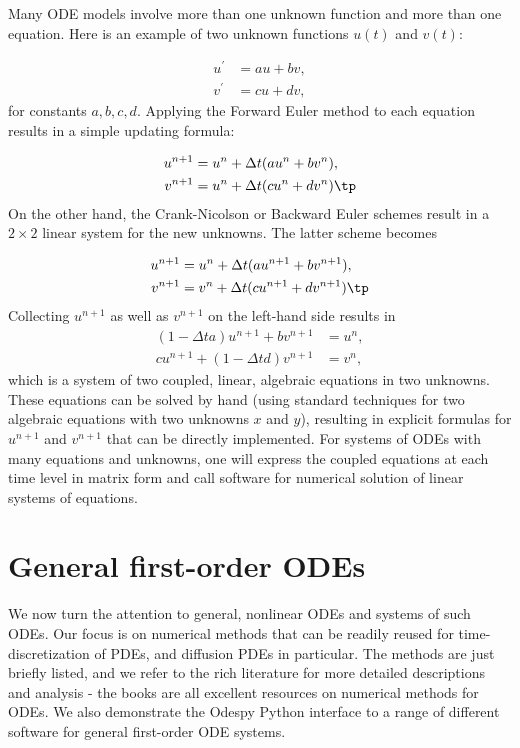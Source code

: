 \documentclass[graybox,sectrefs,envcountresetchap,open=right,final]{svmonodo}
\begin{document}
Many ODE models involve more than one unknown function and more
than one equation. Here is an example of two unknown functions $u(t)$
and $v(t)$:

\begin{align}
u^{\prime} &= a u + bv,\\ 
v^{\prime} &= cu +  dv,
\end{align}
for constants $a,b,c,d$.
Applying the Forward Euler method to each equation results in a simple
updating formula:

\begin{align}
u^{n+1} &= u^n + \Delta t (a u^n + b v^n),\\ 
v^{n+1} &= u^n + \Delta t (cu^n + dv^n)
\tp
\end{align}
On the other hand, the Crank-Nicolson or Backward Euler schemes result in a
$2\times 2$ linear system for the new unknowns. The latter scheme becomes

\begin{align}
u^{n+1} &= u^n + \Delta t (a u^{n+1} + b v^{n+1}),\\ 
v^{n+1} &= v^n + \Delta t (c u^{n+1} + d v^{n+1})\tp
\end{align}
Collecting $u^{n+1}$ as well as $v^{n+1}$ on the left-hand side results
in
\begin{align}
(1 - \Delta t a)u^{n+1} + bv^{n+1} &= u^n ,\\ 
c u^{n+1} + (1 - \Delta t d) v^{n+1} &= v^n ,
\end{align}
which is a system of two coupled, linear, algebraic equations in two
unknowns. These equations can be solved by hand (using standard
techniques for two algebraic equations with two unknowns $x$ and $y$),
resulting in explicit formulas for $u^{n+1}$ and $v^{n+1}$ that can be
directly implemented. For systems of ODEs with many equations and unknowns, one
will express the coupled equations at each time level in matrix form
and call software for numerical solution of linear systems of equations.


\section{General first-order ODEs}

We now turn the attention to general, nonlinear ODEs and systems of
such ODEs.  Our focus is on numerical methods that can be readily
reused for time-discretization of PDEs, and diffusion PDEs in particular.
The methods are just briefly listed, and we refer to the rich literature
for more detailed descriptions and analysis - the books
\cite{Petzold_Ascher_1998,Griffiths_et_al_2010,Hairer_Wanner_Norsett_bookI,Hairer_Wanner_bookII} are all excellent resources on numerical methods for ODEs.
We also demonstrate the Odespy Python interface to a range
of different software for general first-order ODE systems.
\end{document}
